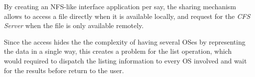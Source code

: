 \documentclass[journal]{IEEEtran}
\begin{document}
\begin{itemize}
	By creating an NFS-like interface application per say, the sharing mechanism allows to access a file directly when it is available locally, and request for the \emph{CFS Server} when the file is only available remotely.

	Since the access hides the the complexity of having several OSes by representing the data in a single way, this creates a problem for the list operation, which would required to dispatch the listing information to every OS involved and wait for the results before return to the user.
	
	
	
	

\end{itemize}
\end{document}
